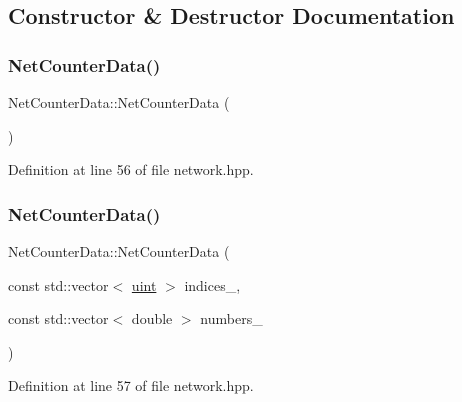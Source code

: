 \subsection{Constructor \& Destructor Documentation}
\mbox{\label{class_net_counter_data_ac3a5083286ad4fad43e6b6d5db1f7caa}} 
\subsubsection{\texorpdfstring{Net\+Counter\+Data()}{NetCounterData()}\hspace{0.1cm}{\footnotesize\ttfamily [1/2]}}
{\footnotesize\ttfamily Net\+Counter\+Data\+::\+Net\+Counter\+Data (\begin{DoxyParamCaption}{ }\end{DoxyParamCaption})\hspace{0.3cm}{\ttfamily [inline]}}



Definition at line 56 of file network.\+hpp.

\mbox{\label{class_net_counter_data_ac816e1f8892a4d6f500df387309c1b1b}} 
\subsubsection{\texorpdfstring{Net\+Counter\+Data()}{NetCounterData()}\hspace{0.1cm}{\footnotesize\ttfamily [2/2]}}
{\footnotesize\ttfamily Net\+Counter\+Data\+::\+Net\+Counter\+Data (\begin{DoxyParamCaption}\item[{const std\+::vector$<$ \hyperlink{typedefs_8hpp_a91ad9478d81a7aaf2593e8d9c3d06a14}{uint} $>$}]{indices\+\_\+,  }\item[{const std\+::vector$<$ double $>$}]{numbers\+\_\+ }\end{DoxyParamCaption})\hspace{0.3cm}{\ttfamily [inline]}}



Definition at line 57 of file network.\+hpp.

